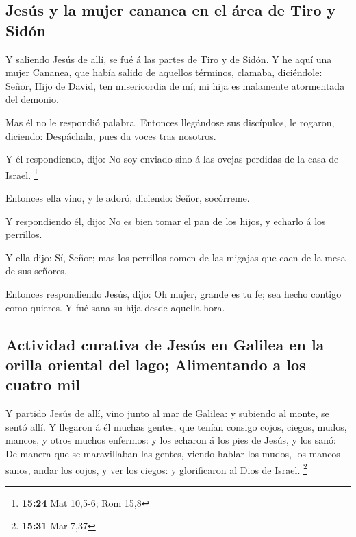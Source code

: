 \hypertarget{jesuxfas-y-la-mujer-cananea-en-el-uxe1rea-de-tiro-y-siduxf3n}{%
\subsection{Jesús y la mujer cananea en el área de Tiro y
Sidón}\label{jesuxfas-y-la-mujer-cananea-en-el-uxe1rea-de-tiro-y-siduxf3n}}

 Y saliendo Jesús de allí, se fué á las partes de Tiro y
de Sidón.  Y he aquí una mujer Cananea, que había salido
de aquellos términos, clamaba, diciéndole: Señor, Hijo de David, ten
misericordia de mí; mi hija es malamente atormentada del demonio.

 Mas él no le respondió palabra. Entonces llegándose sus
discípulos, le rogaron, diciendo: Despáchala, pues da voces tras
nosotros.

 Y él respondiendo, dijo: No soy enviado sino á las
ovejas perdidas de la casa de Israel. \footnote{\textbf{15:24} Mat
  10,5-6; Rom 15,8}

 Entonces ella vino, y le adoró, diciendo: Señor,
socórreme.

 Y respondiendo él, dijo: No es bien tomar el pan de los
hijos, y echarlo á los perrillos.

 Y ella dijo: Sí, Señor; mas los perrillos comen de las
migajas que caen de la mesa de sus señores.

 Entonces respondiendo Jesús, dijo: Oh mujer, grande es
tu fe; sea hecho contigo como quieres. Y fué sana su hija desde aquella
hora.

\hypertarget{actividad-curativa-de-jesuxfas-en-galilea-en-la-orilla-oriental-del-lago-alimentando-a-los-cuatro-mil}{%
\subsection{Actividad curativa de Jesús en Galilea en la orilla oriental
del lago; Alimentando a los cuatro
mil}\label{actividad-curativa-de-jesuxfas-en-galilea-en-la-orilla-oriental-del-lago-alimentando-a-los-cuatro-mil}}

 Y partido Jesús de allí, vino junto al mar de Galilea: y
subiendo al monte, se sentó allí.  Y llegaron á él muchas
gentes, que tenían consigo cojos, ciegos, mudos, mancos, y otros muchos
enfermos: y los echaron á los pies de Jesús, y los sanó: 
De manera que se maravillaban las gentes, viendo hablar los mudos, los
mancos sanos, andar los cojos, y ver los ciegos: y glorificaron al Dios
de Israel. \footnote{\textbf{15:31} Mar 7,37}


